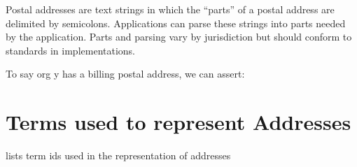 \documentclass[letterpaper,10pt,english]{sphinxmanual}
\begin{document}
\sphinxAtStartPar
Postal addresses are text strings in which the “parts” of a postal address are
delimited by semicolons. Applications can parse these strings into parts needed
by the application. Parts and parsing vary by jurisdiction but should conform to
 standards in implementations.

\sphinxAtStartPar
To say org y has a billing postal address, we can assert:

\begin{sphinxVerbatim}[commandchars=\\\{\}]
  
  
  
  
  
\end{sphinxVerbatim}


\section{Terms used to represent Addresses}
\label{\detokenize{addresses:terms-used-to-represent-addresses}}
\sphinxAtStartPar
{\hyperref[\detokenize{addresses:table-10}]{}} lists term ids used in the representation of addresses
\end{document}
